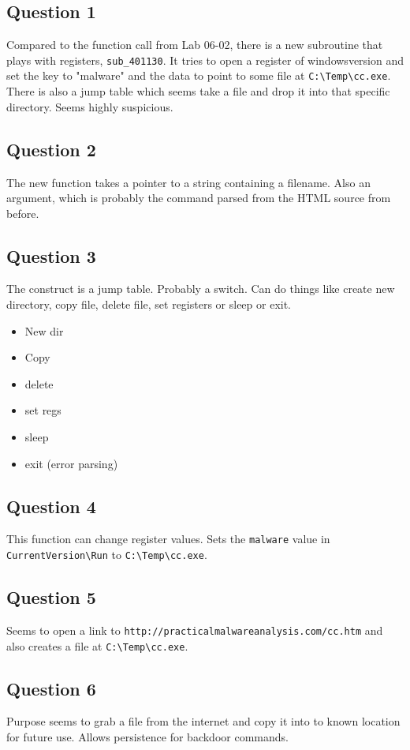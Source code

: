 \documentclass[11pt]{article}
\begin{document}
\subsection{Question 1}
\label{sec-4-1}
Compared to the function call from Lab 06-02, there is a new subroutine that
plays with registers, \texttt{sub\_401130}. It tries to open a register of windowsversion and set
the key to "malware" and the data to point to some file at \texttt{C:\textbackslash{}Temp\textbackslash{}cc.exe}.
There is also a jump table which seems take a file and drop it into that
specific directory. Seems highly suspicious.
\subsection{Question 2}
\label{sec-4-2}
The new function takes a pointer to a string containing a filename. Also an
argument, which is probably the command parsed from the HTML source from
before.
\subsection{Question 3}
\label{sec-4-3}
The construct is a jump table. Probably a switch. Can do things like create
new directory, copy file, delete file, set registers or sleep or exit. 
\begin{itemize}
\item New dir
\item Copy
\item delete
\item set regs
\item sleep
\item exit (error parsing)
\end{itemize}
\subsection{Question 4}
\label{sec-4-4}
This function can change register values. Sets the \texttt{malware} value in \texttt{CurrentVersion\textbackslash{}Run} to
\texttt{C:\textbackslash{}Temp\textbackslash{}cc.exe}.
\subsection{Question 5}
\label{sec-4-5}
Seems to open a link to \texttt{http://practicalmalwareanalysis.com/cc.htm} and also
creates a file at \texttt{C:\textbackslash{}Temp\textbackslash{}cc.exe}. 
\subsection{Question 6}
\label{sec-4-6}
Purpose seems to grab a file from the internet and copy it into to known
location for future use. Allows persistence for backdoor commands.
\end{document}
